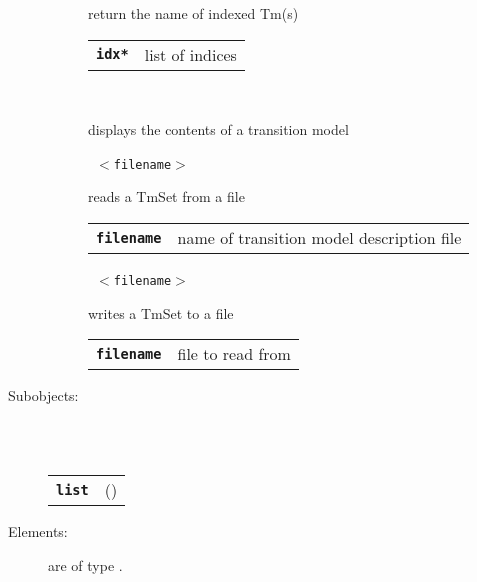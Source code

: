 \begin{description}
\begin{description}
        return the name of indexed Tm(s)

      \begin{tabular}{ll}
 \texttt{\textbf{idx*}} & list of indices \\
      \end{tabular}
       \texttt{} \

        displays the contents of a transition model

       \texttt{ $<$filename$>$} \

        reads a TmSet from a file

      \begin{tabular}{ll}
 \texttt{\textbf{filename}} &  name of transition model description file  \\
      \end{tabular}
       \texttt{ $<$filename$>$} \

        writes a TmSet to a file

      \begin{tabular}{ll}
 \texttt{\textbf{filename}} &  file to read from  \\
      \end{tabular}
    \end{description}

  \item[Subobjects:] \hfill \\
\ 
    \begin{tabular}{ll}
      \texttt{\textbf{list}} & (\Jref{module}{List}) \\
    \end{tabular}
\vspace{3mm}

  \item[Elements:] are of type .


\end{description}

